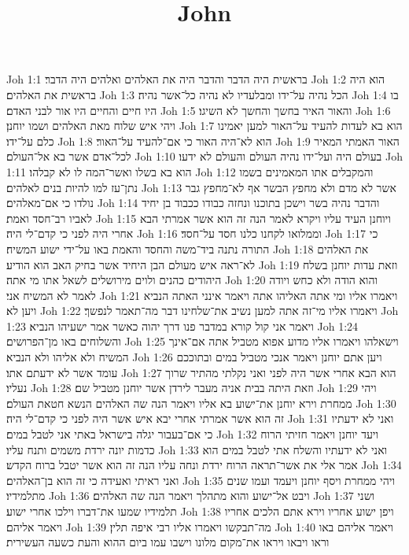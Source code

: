

\title{John}

Joh 1:1  בראשית היה הדבר והדבר היה את האלהים ואלהים היה הדבר׃
Joh 1:2  הוא היה בראשית את האלהים׃
Joh 1:3  הכל נהיה על־ידו ומבלעדיו לא נהיה כל־אשר נהיה׃
Joh 1:4  בו היו חיים והחיים היו אור לבני האדם׃
Joh 1:5  והאור האיר בחשך והחשך לא השיגו׃
Joh 1:6  ויהי איש שלוח מאת האלהים ושמו יוחנן׃
Joh 1:7  הוא בא לעדות להעיד על־האור למען יאמינו כלם על־ידו׃
Joh 1:8  הוא לא־היה האור כי אם־להעיד על־האור׃
Joh 1:9  האור האמתי המאיר לכל־אדם אשר בא אל־העולם׃
Joh 1:10  בעולם היה ועל־ידו נהיה העולם והעולם לא ידעו׃
Joh 1:11  הוא בא בשלו ואשר־המה לו לא קבלהו׃
Joh 1:12  והמקבלים אתו המאמינים בשמו נתן־עז למו להיות בנים לאלהים׃
Joh 1:13  אשר לא מדם ולא מחפץ הבשר אף לא־מחפץ גבר נולדו כי אם־מאלהים׃
Joh 1:14  והדבר נהיה בשר וישכן בתוכנו ונחזה כבודו ככבוד בן יחיד לאביו רב־חסד ואמת׃
Joh 1:15  ויוחנן העיד עליו ויקרא לאמר הנה זה הוא אשר אמרתי הבא אחרי היה לפני כי קדם־לי היה׃
Joh 1:16  וממלואו לקחנו כלנו חסד על־חסד׃
Joh 1:17  כי התורה נתנה ביד־משה והחסד והאמת באו על־ידי ישוע המשיח׃
Joh 1:18  את האלהים לא־ראה איש מעולם הבן היחיד אשר בחיק האב הוא הודיע׃
Joh 1:19  וזאת עדות יוחנן בשלח היהודים כהנים ולוים מירושלים לשאל אתו מי אתה׃
Joh 1:20  והוא הודה ולא כחש ויודה לאמר לא המשיח אני׃
Joh 1:21  ויאמרו אליו ומי אתה האליהו אתה ויאמר אינני האתה הנביא ויען לא׃
Joh 1:22  ויאמרו אליו מי־זה אתה למען נשיב את־שלחינו דבר מה־תאמר לנפשך׃
Joh 1:23  ויאמר אני קול קורא במדבר פנו דרך יהוה כאשר אמר ישעיהו הנביא׃
Joh 1:24  והשלוחים באו מן־הפרושים׃
Joh 1:25  וישאלהו ויאמרו אליו מדוע אפוא מטביל אתה אם־אינך המשיח ולא אליהו ולא הנביא׃
Joh 1:26  ויען אתם יוחנן ויאמר אנכי מטביל במים ובתוככם עומד אשר לא ידעתם אתו׃
Joh 1:27  הוא הבא אחרי אשר היה לפני ואני נקלתי מהתיר שרוך נעליו׃
Joh 1:28  וזאת היתה בבית אניה מעבר לירדן אשר יוחנן מטביל שם׃
Joh 1:29  ויהי ממחרת וירא יוחנן את־ישוע בא אליו ויאמר הנה שה האלהים הנשא חטאת העולם׃
Joh 1:30  זה הוא אשר אמרתי אחרי יבא איש אשר היה לפני כי קדם־לי היה׃
Joh 1:31  ואני לא ידעתיו כי אם־בעבור יגלה בישראל באתי אני לטבל במים׃
Joh 1:32  ויעד יוחנן ויאמר חזיתי הרוח כדמות יונה ירדת משמים ותנח עליו׃
Joh 1:33  ואני לא ידעתיו והשלח אתי לטבל במים הוא אמר אלי את אשר־תראה הרוח ירדת ונחה עליו הנה זה הוא אשר יטבל ברוח הקדש׃
Joh 1:34  ואני ראיתי ואעידה כי זה הוא בן־האלהים׃
Joh 1:35  ויהי ממחרת ויסף יוחנן ויעמד ועמו שנים מתלמידיו׃
Joh 1:36  ויבט אל־ישוע והוא מתהלך ויאמר הנה שה האלהים׃
Joh 1:37  ושני תלמידיו שמעו את־דברו וילכו אחרי ישוע׃
Joh 1:38  ויפן ישוע אחריו וירא אתם הלכים אחריו ויאמר אליהם׃
Joh 1:39  מה־תבקשו ויאמרו אליו רבי איפה תלין׃
Joh 1:40  ויאמר אליהם באו וראו ויבאו ויראו את־מקום מלונו וישבו עמו ביום ההוא והעת כשעה העשירית׃
